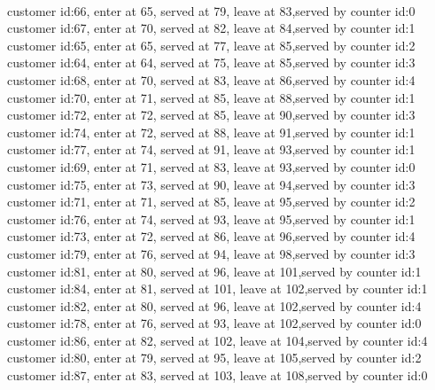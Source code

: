 \documentclass[UTF8]{ctexart}
\begin{document}
\\
customer id:66, enter at 65, served at 79, leave at 83,served by counter id:0
\\
customer id:67, enter at 70, served at 82, leave at 84,served by counter id:1
\\
customer id:65, enter at 65, served at 77, leave at 85,served by counter id:2
\\
customer id:64, enter at 64, served at 75, leave at 85,served by counter id:3
\\
customer id:68, enter at 70, served at 83, leave at 86,served by counter id:4
\\
customer id:70, enter at 71, served at 85, leave at 88,served by counter id:1
\\
customer id:72, enter at 72, served at 85, leave at 90,served by counter id:3
\\
customer id:74, enter at 72, served at 88, leave at 91,served by counter id:1
\\
customer id:77, enter at 74, served at 91, leave at 93,served by counter id:1
\\
customer id:69, enter at 71, served at 83, leave at 93,served by counter id:0
\\
customer id:75, enter at 73, served at 90, leave at 94,served by counter id:3
\\
customer id:71, enter at 71, served at 85, leave at 95,served by counter id:2
\\
customer id:76, enter at 74, served at 93, leave at 95,served by counter id:1
\\
customer id:73, enter at 72, served at 86, leave at 96,served by counter id:4
\\
customer id:79, enter at 76, served at 94, leave at 98,served by counter id:3
\\
customer id:81, enter at 80, served at 96, leave at 101,served by counter id:1
\\
customer id:84, enter at 81, served at 101, leave at 102,served by counter id:1
\\
customer id:82, enter at 80, served at 96, leave at 102,served by counter id:4
\\
customer id:78, enter at 76, served at 93, leave at 102,served by counter id:0
\\
customer id:86, enter at 82, served at 102, leave at 104,served by counter id:4
\\
customer id:80, enter at 79, served at 95, leave at 105,served by counter id:2
\\
customer id:87, enter at 83, served at 103, leave at 108,served by counter id:0
\end{document}
